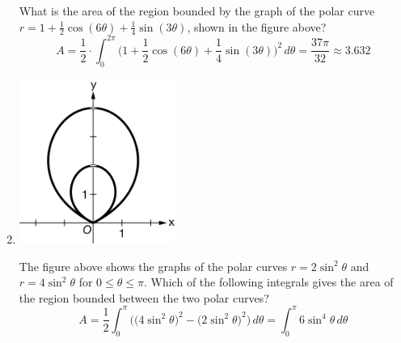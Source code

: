 \documentclass[12pt]{article}
\begin{document}
\begin{enumerate}
\begin{center}
	      \end{center}
	      What is the area of the region bounded by the graph of the polar curve $r= 1 + \frac{1}{2}\cos(6\theta) + \frac{1}{4} \sin(3\theta)$, shown in the figure above?
	      $$A=\frac{1}{2} \cdot\int_{0}^{2\pi} \bigg(1 + \frac{1}{2}\cos(6\theta) + \frac{1}{4} \sin(3\theta)\bigg)^2 \, d\theta = \frac{37\pi}{32} \approx \boxed{3.632}$$
	\item 
	      \begin{center}
	      	\includegraphics[width=2in]{7.037}
	      \end{center}      
	      The figure above shows the graphs of the polar curves $r=2\sin^2\theta$ and $r=4\sin^2\theta$ for $0\leq \theta\leq\pi$. Which of the following integrals gives the area of the region bounded between the two polar curves?
	      $$A = \frac{1}{2} \int_{0}^{\pi} \bigg(\big(4\sin^2\theta\big)^2 - \big(2\sin^2\theta\big)^2\bigg)\, d\theta  = \boxed{\int_{0}^{\pi} 6\sin^4\theta \, d\theta}$$
\end{enumerate}
\end{document}
